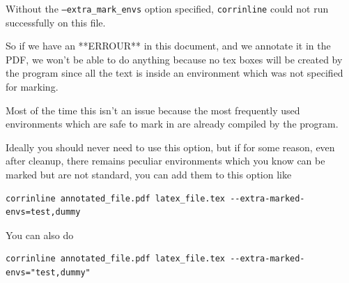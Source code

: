 \documentclass{amsart}
\newenvironment{dummy}{}{}
\newenvironment{test}{}{}
\begin{document}
\begin{dummy}
Without the \texttt{--extra\_mark\_envs} option specified, {\tt corrinline} could not run successfully on this %
file.

So if we have an **ERROUR** in this document, and we annotate it in the PDF, %
we won't be able to do anything because %
no tex boxes %
will be created by %
the program since %
all the text is inside an environment which was not specified for %
marking.

Most of the time this isn't an issue because the %
most frequently used environments which are safe to mark in are %
already compiled
by %
the %
program.

Ideally you %
should never need to use this option, but if for some reason, even after cleanup, there remains
peculiar environments which you know can be marked but are %
not standard, you %
can add %
them to this option like
\begin{verbatim}
corrinline annotated_file.pdf latex_file.tex --extra-marked-envs=test,dummy
\end{verbatim}
\end{dummy}
\begin{test}
You %
can %
also do %
\begin{verbatim}
corrinline annotated_file.pdf latex_file.tex --extra-marked-envs="test,dummy"
\end{verbatim}
\end{test}
\end{document}
